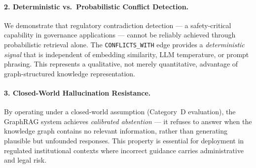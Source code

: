 \paragraph{2. Deterministic vs.\ Probabilistic Conflict Detection.}
We demonstrate that regulatory contradiction detection — a safety-critical capability in governance applications — cannot be reliably achieved through probabilistic retrieval alone. The \texttt{CONFLICTS\_WITH} edge provides a \textit{deterministic signal} that is independent of embedding similarity, LLM temperature, or prompt phrasing. This represents a qualitative, not merely quantitative, advantage of graph-structured knowledge representation.

\paragraph{3. Closed-World Hallucination Resistance.}
By operating under a closed-world assumption (Category~D evaluation), the GraphRAG system achieves \textit{calibrated abstention} — it refuses to answer when the knowledge graph contains no relevant information, rather than generating plausible but unfounded responses. This property is essential for deployment in regulated institutional contexts where incorrect guidance carries administrative and legal risk.


